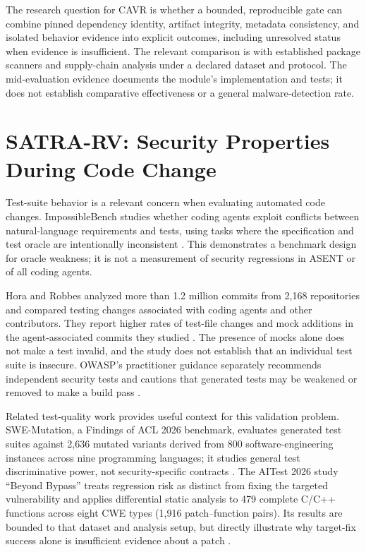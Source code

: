 The research question for CAVR is whether a bounded, reproducible gate can combine pinned dependency identity, artifact integrity, metadata consistency, and isolated behavior evidence into explicit outcomes, including unresolved status when evidence is insufficient. The relevant comparison is with established package scanners and supply-chain analysis under a declared dataset and protocol. The mid-evaluation evidence documents the module's implementation and tests; it does not establish comparative effectiveness or a general malware-detection rate.

\section{SATRA-RV: Security Properties During Code Change}
Test-suite behavior is a relevant concern when evaluating automated code changes. ImpossibleBench studies whether coding agents exploit conflicts between natural-language requirements and tests, using tasks where the specification and test oracle are intentionally inconsistent \cite{zhong2026impossiblebench}. This demonstrates a benchmark design for oracle weakness; it is not a measurement of security regressions in ASENT or of all coding agents.

Hora and Robbes analyzed more than 1.2 million commits from 2,168 repositories and compared testing changes associated with coding agents and other contributors. They report higher rates of test-file changes and mock additions in the agent-associated commits they studied \cite{hora2026overmocked}. The presence of mocks alone does not make a test invalid, and the study does not establish that an individual test suite is insecure. OWASP's practitioner guidance separately recommends independent security tests and cautions that generated tests may be weakened or removed to make a build pass \cite{owaspAICoding}.

Related test-quality work provides useful context for this validation problem. SWE-Mutation, a Findings of ACL 2026 benchmark, evaluates generated test suites against 2,636 mutated variants derived from 800 software-engineering instances across nine programming languages; it studies general test discriminative power, not security-specific contracts \cite{sun2026swemutation}. The AITest 2026 study ``Beyond Bypass'' treats regression risk as distinct from fixing the targeted vulnerability and applies differential static analysis to 479 complete C/C++ functions across eight CWE types (1,916 patch--function pairs). Its results are bounded to that dataset and analysis setup, but directly illustrate why target-fix success alone is insufficient evidence about a patch \cite{shahzad2026beyondbypass}.

